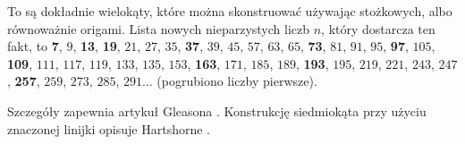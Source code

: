 To są dokładnie wielokąty, które można skonstruować używając stożkowych, albo równoważnie origami.
Lista nowych nieparzystych liczb $n$, który dostarcza ten fakt, to \textbf{7}, $9$, \textbf{13}, \textbf{19}, $21$, $27$, $35$, \textbf{37}, $39$, $45$, $57$, $63$, $65$, \textbf{73}, $81$, $91$, $95$, \textbf{97}, $105$, \textbf{109}, $111$, $117$, $119$, $133$, $135$, $153$, \textbf{163}, $171$, $185$, $189$, \textbf{193}, $195$, $219$, $221$, $243$, $247$, \textbf{257}, $259$, $273$, $285$, $291\ldots$ (pogrubiono liczby pierwsze).

Szczegóły zapewnia artykuł Gleasona \cite{gleason_1988}.
%
Konstrukcję siedmiokąta przy użyciu znaczonej linijki opisuje Hartshorne .
